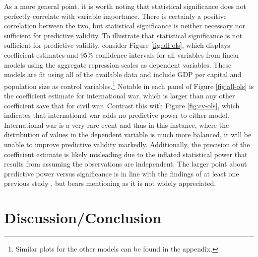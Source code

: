 \documentclass[11pt]{article}
\begin{document}
As a more general point, it is worth noting that statistical significance does not perfectly correlate with variable importance. There is certainly a positive correlation between the two, but statistical significance is neither necessary nor sufficient for predictive validity. To illustrate that statistical significance is not sufficient for predictive validity, consider Figure \ref{fig:all-ols}, which displays coefficient estimates and 95\% confidence intervals for all variables from linear models using the aggregate repression scales as dependent variables. These models are fit using all of the available data and include GDP per capital and population size as control variables.\footnote{Similar plots for the other models can be found in the appendix.}  Notable in each panel of Figure \ref{fig:all-ols} is the coefficient estimate for international war, which is larger than any other coefficient save that for civil war. Contrast this with Figure \ref{fig:cv-ols}, which indicates that international war adds no predictive power to either model. International war is a very rare event and thus in this instance, where the distribution of values in the dependent variable is much more balanced, it will be unable to improve predictive validity markedly. Additionally, the precision of the coefficient estimate is likely misleading due to the inflated statistical power that results from assuming the observations are independent. The larger point about predictive power versus significance is in line with the findings of at least one previous study \citep{Wardetal2010}, but bears mentioning as it is not widely appreciated.

\section*{Discussion/Conclusion}
\end{document}
